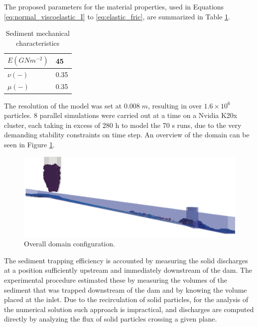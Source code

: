The proposed parameters for the material properties, used in Equations \eqref{eq:normal_viscoelastic_I} to \eqref{eq:elastic_fric}, are summarized in Table \ref{tab:materials}.

\begin{table}[!ht]
\begin{center}
\begin{tabular}{l|l} 
$E (GNm^{-2})$ & 45 \\
\hline
$\nu (-)$ & 0.35 \\
\hline
$\mu (-)$ & 0.35 
\end{tabular}
\end{center}
\caption{Sediment mechanical characteristics}
\label{tab:materials}
\end{table}

The resolution of the model was set at $0.008 \; m$, resulting in over $1.6\times10^6$ particles. 8 parallel simulations were carried out at a time on a Nvidia K20x cluster, each taking in excess of 280 h to model the 70 s runs, due to the very demanding stability constraints on time step. An overview of the domain can be seen in Figure \ref{fig:overall}.
%
\begin{figure}[ht!]
	\centering
	\includegraphics[width=0.75\linewidth]{Figures/6.Chapter/frame4}
	\caption{Overall domain configuration.}
	\label{fig:overall} 
\end{figure}
%

The sediment trapping efficiency is accounted by measuring the solid discharges at a position sufficiently upstream and immediately downstream of the dam. The experimental procedure estimated these by measuring the volumes of the sediment that was trapped downstream of the dam and by knowing the volume placed at the inlet. Due to the recirculation of solid particles, for the analysis of the numerical solution such approach is impractical, and discharges are computed directly by analyzing the flux of solid particles crossing a given plane.

